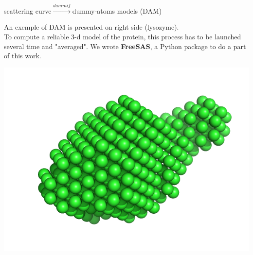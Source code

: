 \documentclass[12pt]{article}
\begin{document}
\vspace{-0.6cm}
\begin{minipage}{0.60\linewidth}
    \begin{center}\begin{large}
    scattering curve$\overset{\textit{dammif}}{\longrightarrow}$dummy-atoms models (DAM)
    \end{large}\end{center}
    An exemple of DAM is presented on right side (lysozyme).\\
    To compute a reliable 3-d model of the protein, this process has to 
    be launched several time and "averaged". 
    We wrote \textbf{FreeSAS}, a Python package to do a part of this work.
\end{minipage} \hfill
\begin{minipage}{0.35\linewidth}
    \begin{flushleft}
    \includegraphics[scale=0.3]{model.png}
    \end{flushleft}
\end{minipage}
\end{document}
